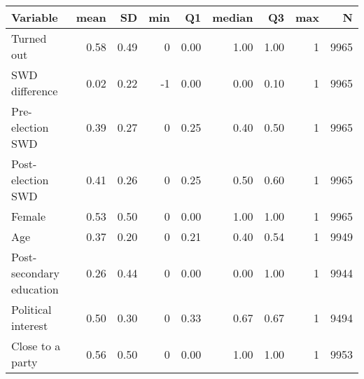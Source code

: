 
\begin{tabular}{l|r|r|r|r|r|r|r|r}
\hline
Variable & mean & SD & min & Q1 & median & Q3 & max & N\\
\hline
Turned out & 0.58 & 0.49 & 0 & 0.00 & 1.00 & 1.00 & 1 & 9965\\
\hline
SWD difference & 0.02 & 0.22 & -1 & 0.00 & 0.00 & 0.10 & 1 & 9965\\
\hline
Pre-election SWD & 0.39 & 0.27 & 0 & 0.25 & 0.40 & 0.50 & 1 & 9965\\
\hline
Post-election SWD & 0.41 & 0.26 & 0 & 0.25 & 0.50 & 0.60 & 1 & 9965\\
\hline
Female & 0.53 & 0.50 & 0 & 0.00 & 1.00 & 1.00 & 1 & 9965\\
\hline
Age & 0.37 & 0.20 & 0 & 0.21 & 0.40 & 0.54 & 1 & 9949\\
\hline
Post-secondary education & 0.26 & 0.44 & 0 & 0.00 & 0.00 & 1.00 & 1 & 9944\\
\hline
Political interest & 0.50 & 0.30 & 0 & 0.33 & 0.67 & 0.67 & 1 & 9494\\
\hline
Close to a party & 0.56 & 0.50 & 0 & 0.00 & 1.00 & 1.00 & 1 & 9953\\
\hline
\end{tabular}

